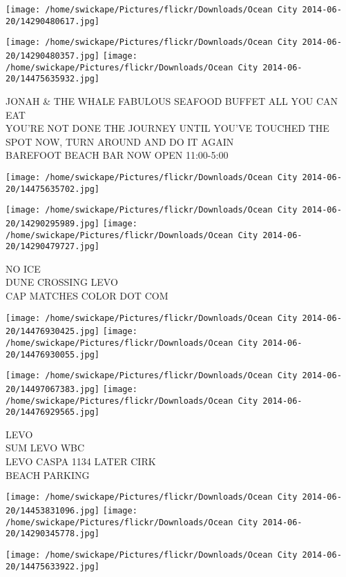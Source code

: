 \documentclass[10pt,letterpaper]{article}
\begin{document}
\texttt{[image: /home/swickape/Pictures/flickr/Downloads/Ocean City 2014-06-20/14290480617.jpg]}

\vspace{0.25in}
\texttt{[image: /home/swickape/Pictures/flickr/Downloads/Ocean City 2014-06-20/14290480357.jpg]}
\texttt{[image: /home/swickape/Pictures/flickr/Downloads/Ocean City 2014-06-20/14475635932.jpg]}

JONAH \& THE WHALE FABULOUS SEAFOOD BUFFET ALL YOU CAN EAT\\
YOU'RE NOT DONE THE JOURNEY UNTIL YOU'VE TOUCHED THE SPOT NOW, TURN AROUND AND DO IT AGAIN\\
BAREFOOT BEACH BAR NOW OPEN 11:00{-}5:00
\pagebreak

\texttt{[image: /home/swickape/Pictures/flickr/Downloads/Ocean City 2014-06-20/14475635702.jpg]}

\vspace{0.25in}
\texttt{[image: /home/swickape/Pictures/flickr/Downloads/Ocean City 2014-06-20/14290295989.jpg]}
\texttt{[image: /home/swickape/Pictures/flickr/Downloads/Ocean City 2014-06-20/14290479727.jpg]}

NO ICE\\
DUNE CROSSING LEVO\\
CAP MATCHES COLOR DOT COM
\pagebreak

\texttt{[image: /home/swickape/Pictures/flickr/Downloads/Ocean City 2014-06-20/14476930425.jpg]}
\texttt{[image: /home/swickape/Pictures/flickr/Downloads/Ocean City 2014-06-20/14476930055.jpg]}

\texttt{[image: /home/swickape/Pictures/flickr/Downloads/Ocean City 2014-06-20/14497067383.jpg]}
\texttt{[image: /home/swickape/Pictures/flickr/Downloads/Ocean City 2014-06-20/14476929565.jpg]}

LEVO\\
SUM LEVO WBC\\
LEVO CASPA 1134 LATER CIRK\\
BEACH PARKING
\pagebreak

\texttt{[image: /home/swickape/Pictures/flickr/Downloads/Ocean City 2014-06-20/14453831096.jpg]}
\texttt{[image: /home/swickape/Pictures/flickr/Downloads/Ocean City 2014-06-20/14290345778.jpg]}

\vspace{0.25in}
\texttt{[image: /home/swickape/Pictures/flickr/Downloads/Ocean City 2014-06-20/14475633922.jpg]}
\end{document}
